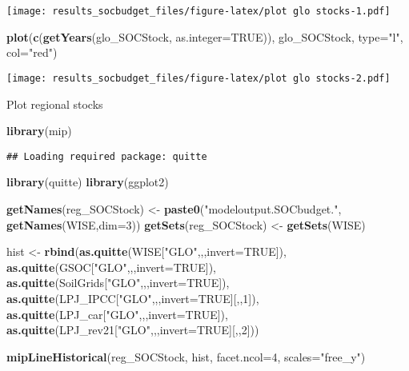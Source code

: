\documentclass[
]{article}
\newenvironment{Shaded}{\begin{snugshade}}{\end{snugshade}}
\newcommand{\DataTypeTok}[1]{\textcolor[rgb]{0.13,0.29,0.53}{#1}}
\newcommand{\DecValTok}[1]{\textcolor[rgb]{0.00,0.00,0.81}{#1}}
\newcommand{\KeywordTok}[1]{\textcolor[rgb]{0.13,0.29,0.53}{\textbf{#1}}}
\newcommand{\NormalTok}[1]{#1}
\newcommand{\OtherTok}[1]{\textcolor[rgb]{0.56,0.35,0.01}{#1}}
\newcommand{\StringTok}[1]{\textcolor[rgb]{0.31,0.60,0.02}{#1}}
\begin{document}
\texttt{[image: results\_socbudget\_files/figure-latex/plot glo stocks-1.pdf]}

\begin{Shaded}
\begin{Highlighting}[]
\KeywordTok{plot}\NormalTok{(}\KeywordTok{c}\NormalTok{(}\KeywordTok{getYears}\NormalTok{(glo\_SOCStock, }\DataTypeTok{as.integer=}\OtherTok{TRUE}\NormalTok{)), glo\_SOCStock, }\DataTypeTok{type=}\StringTok{"l"}\NormalTok{, }\DataTypeTok{col=}\StringTok{"red"}\NormalTok{)}
\end{Highlighting}
\end{Shaded}

\texttt{[image: results\_socbudget\_files/figure-latex/plot glo stocks-2.pdf]}

Plot regional stocks

\begin{Shaded}
\begin{Highlighting}[]
\KeywordTok{library}\NormalTok{(mip)}
\end{Highlighting}
\end{Shaded}

\begin{verbatim}
## Loading required package: quitte
\end{verbatim}

\begin{Shaded}
\begin{Highlighting}[]
\KeywordTok{library}\NormalTok{(quitte)}
\KeywordTok{library}\NormalTok{(ggplot2)}

\KeywordTok{getNames}\NormalTok{(reg\_SOCStock) <{-}}\StringTok{ }\KeywordTok{paste0}\NormalTok{(}\StringTok{"modeloutput.SOCbudget."}\NormalTok{, }\KeywordTok{getNames}\NormalTok{(WISE,}\DataTypeTok{dim=}\DecValTok{3}\NormalTok{))}
\KeywordTok{getSets}\NormalTok{(reg\_SOCStock)  <{-}}\StringTok{ }\KeywordTok{getSets}\NormalTok{(WISE) }

\NormalTok{hist <{-}}\StringTok{ }\KeywordTok{rbind}\NormalTok{(}\KeywordTok{as.quitte}\NormalTok{(WISE[}\StringTok{"GLO"}\NormalTok{,,,}\DataTypeTok{invert=}\OtherTok{TRUE}\NormalTok{]),}
              \KeywordTok{as.quitte}\NormalTok{(GSOC[}\StringTok{"GLO"}\NormalTok{,,,}\DataTypeTok{invert=}\OtherTok{TRUE}\NormalTok{]),}
              \KeywordTok{as.quitte}\NormalTok{(SoilGrids[}\StringTok{"GLO"}\NormalTok{,,,}\DataTypeTok{invert=}\OtherTok{TRUE}\NormalTok{]),}
              \KeywordTok{as.quitte}\NormalTok{(LPJ\_IPCC[}\StringTok{"GLO"}\NormalTok{,,,}\DataTypeTok{invert=}\OtherTok{TRUE}\NormalTok{][,,}\DecValTok{1}\NormalTok{]),}
              \KeywordTok{as.quitte}\NormalTok{(LPJ\_car[}\StringTok{"GLO"}\NormalTok{,,,}\DataTypeTok{invert=}\OtherTok{TRUE}\NormalTok{]),}
              \KeywordTok{as.quitte}\NormalTok{(LPJ\_rev21[}\StringTok{"GLO"}\NormalTok{,,,}\DataTypeTok{invert=}\OtherTok{TRUE}\NormalTok{][,,}\DecValTok{2}\NormalTok{]))}

\KeywordTok{mipLineHistorical}\NormalTok{(reg\_SOCStock, hist, }\DataTypeTok{facet.ncol=}\DecValTok{4}\NormalTok{, }\DataTypeTok{scales=}\StringTok{"free\_y"}\NormalTok{)}
\end{Highlighting}
\end{Shaded}
\end{document}
